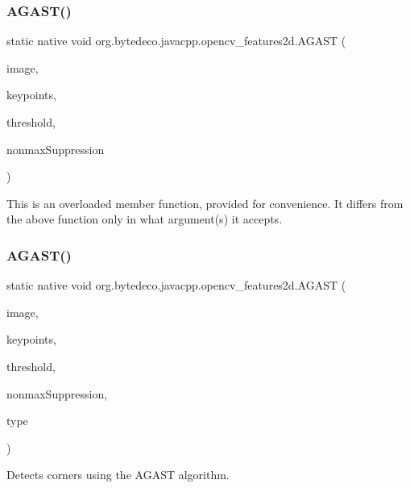 \subsubsection{\texorpdfstring{A\+G\+A\+S\+T()}{AGAST()}\hspace{0.1cm}{\footnotesize\ttfamily [1/2]}}
{\footnotesize\ttfamily static native void org.\+bytedeco.\+javacpp.\+opencv\+\_\+features2d.\+A\+G\+A\+ST (\begin{DoxyParamCaption}\item[{@By\+Val Mat}]{image,  }\item[{@By\+Ref Key\+Point\+Vector}]{keypoints,  }\item[{int}]{threshold,  }\item[{@Cast(\char`\"{}bool\char`\"{}) boolean}]{nonmax\+Suppression }\end{DoxyParamCaption})\hspace{0.3cm}{\ttfamily [static]}}

This is an overloaded member function, provided for convenience. It differs from the above function only in what argument(s) it accepts. \mbox{\label{group__features2d__main_ga2126ee1b1b70316ae0fd6ffb3d2d51bc}} 
\subsubsection{\texorpdfstring{A\+G\+A\+S\+T()}{AGAST()}\hspace{0.1cm}{\footnotesize\ttfamily [2/2]}}
{\footnotesize\ttfamily static native void org.\+bytedeco.\+javacpp.\+opencv\+\_\+features2d.\+A\+G\+A\+ST (\begin{DoxyParamCaption}\item[{@By\+Val Mat}]{image,  }\item[{@By\+Ref Key\+Point\+Vector}]{keypoints,  }\item[{int}]{threshold,  }\item[{@Cast(\char`\"{}bool\char`\"{}) boolean}]{nonmax\+Suppression,  }\item[{int}]{type }\end{DoxyParamCaption})\hspace{0.3cm}{\ttfamily [static]}}



Detects corners using the A\+G\+A\+ST algorithm. 


